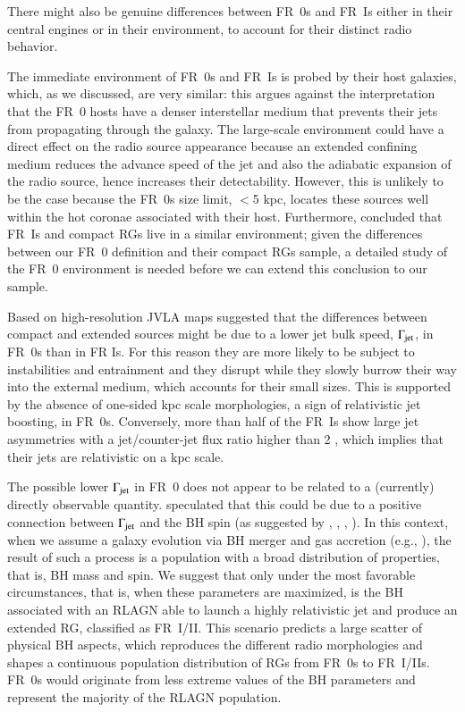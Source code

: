 \documentclass[traditabstract]{aa}
\begin{document}
There might also be genuine differences between FR~0s and FR~Is either
in their central engines or in their environment, to account for their
distinct radio behavior.

The immediate environment of FR~0s and FR~Is is probed by their host
galaxies, which, as we discussed, are very similar: this argues
against the interpretation that the FR~0 hosts have a denser
interstellar medium that prevents their jets from propagating through
the galaxy. The large-scale environment could have a direct effect on
the radio source appearance because an extended confining medium
reduces the advance speed of the jet and also the adiabatic expansion
of the radio source, hence increases their detectability. However,
this is unlikely to be the case because the FR~0s size limit, $<$5
kpc, locates these sources well within the hot coronae associated with
their host. Furthermore, \citet{miraghaei17} concluded that FR~Is and
compact RGs live in a similar environment; given the differences
between our FR~0 definition and their compact RGs sample, a detailed
study of the FR~0 environment is needed before we can extend this
conclusion to our sample.

Based on high-resolution JVLA maps \citet{baldi15} suggested that the
differences between compact and extended sources might be due to a
lower jet bulk speed, $\Gamma_{\rm jet}$, in FR~0s than in FR Is. For
this reason they are more likely to be subject to instabilities and
entrainment \citep{bodo13} and they disrupt while they slowly burrow
their way into the external medium, which accounts for their small
sizes. This is supported by the absence of one-sided kpc scale
morphologies, a sign of relativistic jet boosting, in
FR~0s. Conversely, more than half of the FR~Is show large jet
asymmetries with a jet/counter-jet flux ratio higher than 2
\citep{parma87}, which implies that their jets are relativistic on a
kpc scale.

The possible lower $\Gamma_{\rm jet}$ in FR~0 does not appear to be
related to a (currently) directly observable
quantity. \citeauthor{baldi15} speculated that this could be due to a
positive connection between $\Gamma_{\rm jet}$ and the BH spin (as
suggested by \citealt{mckinney05}, \citealt{tchekhovskoy10},
\citealt{chai12}, \citealt{maraschi12}). In this context, when we
assume a galaxy evolution via BH merger and gas accretion (e.g.,
\citealt{volonteri13}), the result of such a process is a population
with a broad distribution of properties, that is, BH mass and spin. We
suggest that only under the most favorable circumstances, that is,
when these parameters are maximized, is the BH associated with an
RLAGN able to launch a highly relativistic jet and produce an extended
RG, classified as FR~I/II. This scenario predicts a large scatter of
physical BH aspects, which reproduces the different radio morphologies
and shapes a continuous population distribution of RGs from FR~0s to
FR~I/IIs. FR~0s would originate from less extreme values of the BH
parameters and represent the majority of the RLAGN population.
\end{document}
